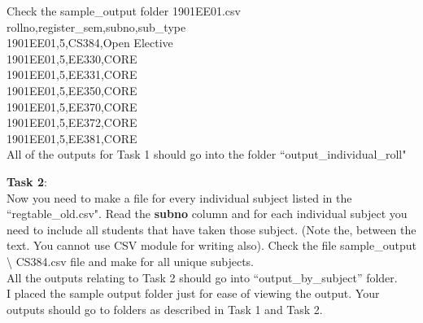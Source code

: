 \documentclass[12pt,  letterpaper,  twoside]{article}
\begin{document}
Check the sample\_output folder
\noindent 1901EE01.csv\\ 
rollno,register\_sem,subno,sub\_type\\
1901EE01,5,CS384,Open Elective\\
1901EE01,5,EE330,CORE\\
1901EE01,5,EE331,CORE\\
1901EE01,5,EE350,CORE\\
1901EE01,5,EE370,CORE\\
1901EE01,5,EE372,CORE\\
1901EE01,5,EE381,CORE\\

All of the outputs for Task 1 should go into the folder 
``output\_individual\_roll"
	
\textbf{Task 2}:\\
Now you need to make a file for every individual subject listed in the 
``regtable\_old.csv". Read the 	\textbf{subno} column	and for each individual 
subject 
you need to include all students that have taken those subject. (Note the, 
between the text. You cannot use CSV 
module for writing also). Check the file  sample\_output \textbackslash 
CS384.csv file and make for all unique subjects.\\

All the outputs relating to Task 2 should go into ``output\_by\_subject'' 
folder. \\

\noindent I placed the sample output folder just for ease of viewing the 
output. Your outputs should go to folders as described in Task 1 and Task 2.
	
\end{document}
